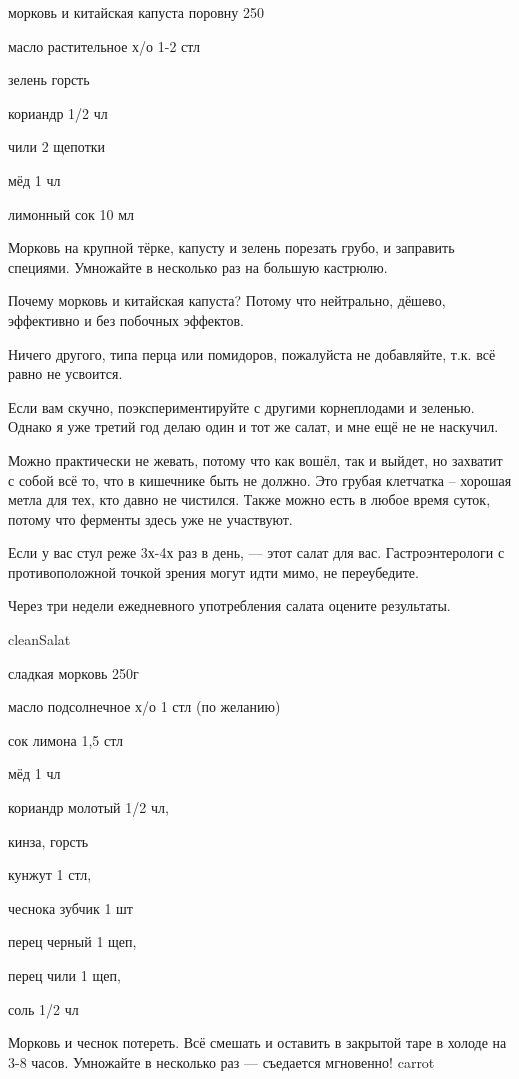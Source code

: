 {\label{cleanSalad}
\item морковь и китайская капуста поровну 250
\item масло растительное х/о 1-2 стл
\item зелень горсть
}{
\item кориандр 1/2 чл
\item чили 2 щепотки
\item мёд 1 чл
\item лимонный сок 10 мл
}{
Морковь на крупной тёрке, капусту и зелень порезать грубо, и заправить специями. Умножайте в несколько раз на большую кастрюлю.
}{
\begin{advice}
\item Почему морковь и китайская капуста? Потому что нейтрально, дёшево, эффективно и без побочных эффектов. 
\item Ничего другого, типа перца или помидоров, пожалуйста не добавляйте, т.к. всё равно не усвоится. 
\item Если вам скучно, поэкспериментируйте с другими корнеплодами и зеленью. Однако я уже третий год делаю один и тот же салат, и мне ещё не не наскучил.

\item Можно практически не жевать, потому что как вошёл, так и выйдет, но захватит с собой всё то, что в кишечнике быть не должно. Это грубая клетчатка – хорошая метла для тех, кто давно не чистился. Также можно есть в любое время суток, потому что ферменты здесь уже не участвуют.
\item Если у вас стул реже 3х-4х раз в день, — этот салат для вас. 
Гастроэнтерологи с противоположной точкой зрения могут идти мимо, не переубедите.


\item Через три недели ежедневного употребления салата оцените результаты. 

\end{advice}
}{cleanSalat}




{
\item сладкая морковь 250г
\item масло подсолнечное х/о 1 стл (по желанию)
\item сок лимона 1,5 стл
\item мёд 1 чл
\item кориандр молотый 1/2 чл,
\item кинза, горсть
}{
\item кунжут 1 стл,
\item чеснока зубчик 1 шт
\item перец черный 1 щеп,
\item перец чили 1 щеп,
\item соль 1/2 чл
}{
Морковь и чеснок потереть. Всё смешать и оставить в закрытой таре в холоде на 3-8 часов. Умножайте в несколько раз — съедается мгновенно!
}{}{carrot}



